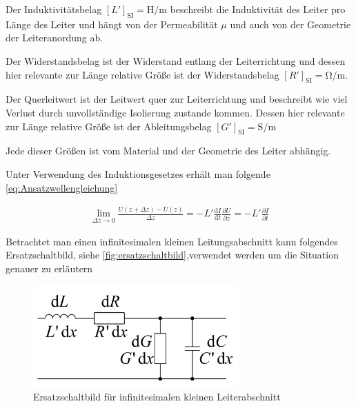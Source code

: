 \documentclass[11pt,ngerman]{scrartcl}
\newcommand{\der}[2]{\frac{\mathrm{d}#1}{\mathrm{d}#2}}
\newcommand{\pder}[2]{\frac{\partial #1}{\partial #2}}
\begin{document}
\noindent Der Induktivitätsbelag $[L']_{\text{SI}} = \si{\henry\per\meter}$ beschreibt
die Induktivität des Leiter pro Länge des Leiter und hängt von der
Permeabilität $\mu$ und auch von der Geometrie der Leiteranordung ab.

\noindent Der Widerstandsbelag ist der Widerstand entlang der Leiterrichtung und dessen
hier relevante zur Länge relative Größe ist der Widerstandsbelag $[R']_{\text{SI}} =
	\si{\ohm\per\meter}$.

\noindent Der Querleitwert ist der Leitwert quer zur Leiterrichtung und beschreibt
wie viel Verlust durch unvollständige Isolierung zustande kommen. Dessen
hier relevante zur Länge relative Größe ist der Ableitungsbelag $[G']_{\text{SI}} =
	\si{\siemens\per\meter}$


\noindent Jede dieser Größen ist vom Material und der Geometrie des Leiter abhängig.

\noindent Unter Verwendung des Induktionsgesetzes erhält man folgende
\autoref{eq:Ansatzwellengleichung}

\begin{align}
	\lim_{\Delta z \to 0} \frac{U(z+\Delta z) - U(z)}{\Delta z} = - L' \der{I}{t}
	\pder{U}{z} = - L' \pder{I}{t}
	\label{eq:Ansatzwellengleichung}
\end{align}

\noindent Betrachtet man einen infinitesimalen kleinen Leitungsabschnitt kann folgendes
Ersatzschaltbild, siehe \autoref{fig:ersatzschaltbild},verwendet werden um die Situation genauer zu erläutern

\begin{figure}
	\begin{center}
		\includegraphics[width=0.7\textwidth]{./figures/ersatzschaltbild.svg.png}
	\end{center}
	\caption{Ersatzschaltbild für infinitesimalen kleinen Leiterabschnitt \cite{wellenleitungskizze}}
	\label{fig:ersatzschaltbild}
\end{figure}

\vspace{2mm}
\end{document}
